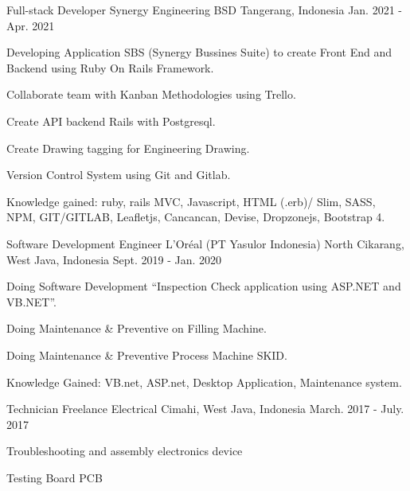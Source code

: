\begin{cventries}
  \cventry
    {Full-stack Developer} %
    {Synergy Engineering} %
    {BSD Tangerang, Indonesia} %
    {Jan. 2021 - Apr. 2021} %
    {
      \begin{cvitems} %
        \item {Developing Application SBS (Synergy Bussines Suite) to create Front End and Backend using Ruby On Rails Framework.}
        \item {Collaborate team with Kanban Methodologies using Trello.}
        \item {Create API backend Rails with Postgresql.}
        \item {Create Drawing tagging for Engineering Drawing.}
        \item {Version Control System using Git and Gitlab.}
        \item {Knowledge gained: ruby, rails MVC, Javascript, HTML (.erb)/ Slim, SASS, NPM, GIT/GITLAB, Leafletjs, Cancancan, Devise, Dropzonejs, Bootstrap 4.}
      \end{cvitems}
    }

  \cventry
    {Software Development Engineer} %
    {L'Oréal (PT Yasulor Indonesia)} %
    {North Cikarang, West Java, Indonesia} %
    {Sept. 2019 - Jan. 2020} %
    {
      \begin{cvitems} %
        \item {Doing Software Development “Inspection Check application using ASP.NET and VB.NET”.}
        \item {Doing Maintenance \& Preventive on Filling Machine.}
        \item {Doing Maintenance \& Preventive Process Machine SKID.}
        \item {Knowledge Gained: VB.net, ASP.net, Desktop Application, Maintenance system.}
      \end{cvitems}
    }

  \cventry
    {Technician} %
    {Freelance Electrical}
    {Cimahi, West Java, Indonesia} %
    {March. 2017 - July. 2017} %
    {
      \begin{cvitems} %
        \item {Troubleshooting and assembly electronics device}
        \item {Testing Board PCB}
      \end{cvitems}
    }


\end{cventries}
